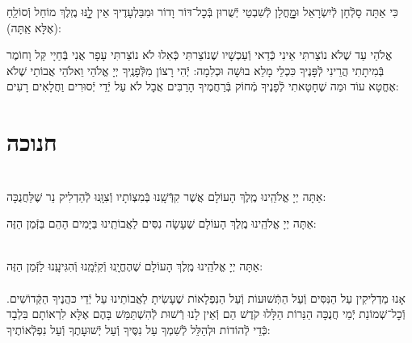\documentclass[twoside, openany, parskip=half, 11pt]{book}
\begin{document}
כִּי אַתָּה סָלְֿחָן לְֿיִשְׂרָאֵל וּמׇׇׇׇָחֳלָן לְֿשִׁבְטֵי יְֿשֻׁרוּן בְּֿכׇל־דּוֹר וָדוֹר
וּמִבַּלְעָדֶיךָ אֵין לׇׇָֽנּוּ מֶֽלֶךְ מוֹחֵל וְֿסוֹלֵֽחַ (אֶלָּא אַֽתָּה):

אֱלֹהַי עַד שֶׁלֹא נוֹצַרתִּי אֵינִי כְּֿדַאי וְֿעַכְשָׁיו שֶׁנוֹצַרתִּי כְּֿאִלוּ לֹא נוֹצַרתִּי עָפָר אֲנִי בְּֿחַיָי קַּל וָחוֹמֶר בְּֿמִיתָתִי הֲרֵינִי לְֿפָּנֶיךָ כִּכְלֵי מָלֵא בוּשָׁה וּכְלִמָה: יְֿהִי רָצוֹן מִלְּֿפָנֶֽיךָ יְיָ אֱלֹהַי וֵאלֹהֵי אֲבוֹתַי שֶׁלֹא אֶחֱטָא עוֹד וּמַה שֶׁחָטָאתִי לְֿפָנֶיךָ מְֿחוֹק בְּֿרַחֲמֶיךָ הָרַבִּים אֲבָל לֹא עַל יְֿדֵי יְֿסוּרִים וַחֲלָאִים רָעִים:

\vfill
\sepline

\chapter[חנוכה]{ חנוכה }
\label{chanukah}

\\
אַתָּה יְיָ אֱלֹהֵֽינוּ מֶֽלֶךְ הָעוֹלָם
אֲשֶׁר קִדְּֿשָֽׁנוּ בְּֿמִצְוֹתָיו וְֿצִוָּֽנוּ לְֿהַדְלִיק נֵר שֶׁלַּחֲנֻכָּה:

אַתָּה יְיָ אֱלֹהֵֽינוּ מֶֽלֶךְ הָעוֹלָם שֶׁעָשָׂה נִסִּים לַאֲבוֹתֵֽינוּ בַּיָּמִים הָהֵם בַּזְּֿמַן הַזֶּה:

\\
אַתָּה יְיָ אֱלֹהֵֽינוּ מֶֽלֶךְ הָעוֹלָם שֶׁהֶחֱיָֽנוּ וְֿקִיְּֿמָֽנוּ וְֿהִגִּיעָֽנוּ לַזְּֿמַן הַזֶּה:\\

\\
אָנוּ מַדְלִיקִין
עַל הַנִּסִּים וְֿעַל הַתְּֿשׁוּעוֹת
וְֿעַל הַנִּפְלָאוֹת
שֶׁעָשִׂיתָ לַאֲבוֹתֵינוּ
עַל יְֿדֵי כּהֲנֶיךָ הַקְּֿדוֹשִׁים.
וְֿכׇל־שְׁמוֹנַת יְֿמֵי חֲנֻכָּה
הַנֵּרוֹת הַלָּלוּ קֹדֶשׁ הֵם
וְֿאֵין לָנוּ רְֿשׁוּת לְֿהִשְׁתַּמֵּשׁ בָּהֶם
אֶלָּא לִרְאוֹתָם בִּלְבָד
כְּֿדֵי לְֿהוֹדוֹת וּלְהַלֵּל לְֿשִׁמְךָ
עַל נִסֶּיךָ וְֿעַל יְֿשׁוּעָתֶךָ
וְֿעַל נִפְלְֿאוֹתֶיךָ:
\end{document}
